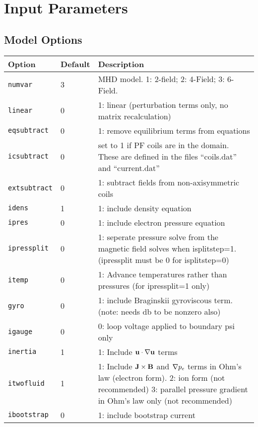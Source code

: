 \section{Input Parameters}
\label{sec:input_parameters}
\subsection{Model Options}

\begin{tabular}{llp{4in}}
  \textbf{Option}&\textbf{Default}&\textbf{Description}\\
  \hline
  \texttt{numvar} & 3   & MHD model. 1: 2-field;  2: 4-Field;  3: 6-Field.\\
  \texttt{linear} & 0   & 1: linear (perturbation terms only, no matrix
  recalculation)\\
  \texttt{eqsubtract}& 0& 1: remove equilibrium terms from equations\\
  \texttt{icsubtract}& 0& set to 1 if PF coils are in the domain.  These are
  defined in the files ``coils.dat'' and ``current.dat''\\
  \texttt{extsubtract} & 0 & 1: subtract fields from non-axisymmetric coils \\
  \texttt{idens}  & 1   & 1: include density equation\\
  \texttt{ipres}  & 0   & 1: include electron pressure equation\\
  \texttt{ipressplit} & 0 & 1: seperate pressure solve from the magnetic field
  solves when isplitstep=1.  (ipressplit must be 0 for isplitstep=0) \\
  \texttt{itemp} & 0 & 1: Advance temperatures rather than pressures (for ipressplit=1 only) \\
  \texttt{gyro}   & 0   & 1: include Braginskii gyroviscous term.  (note:
  needs db to be nonzero also) \\
  \texttt{igauge} & 0   & 0: loop voltage applied to boundary psi only \\
  \texttt{inertia} & 1  & 1: Include $\mathbf{u} \cdot \nabla \mathbf{u}$ terms\\
  \texttt{itwofluid}& 1 & 1: Include $\mathbf{J}\times\mathbf{B}$ and
  $\nabla p_e$ terms in Ohm's law (electron form).  2: ion form (not
  recommended)  3: parallel pressure gradient in Ohm's law only
  (not recommended) \\
  \texttt{ibootstrap} & 0 & 1: include bootstrap current \\

\end{tabular}
